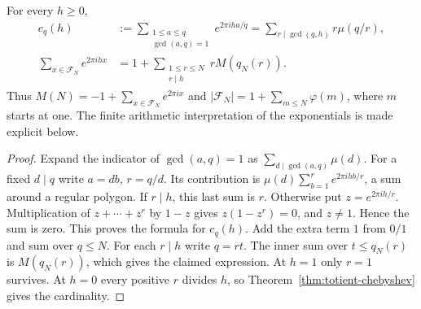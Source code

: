 \begin{theorem}\label{thm:farey}
For every $h\ge0$,
\begin{align*}
 c_q(h)&:=\sum_{\substack{1\le a\le q\\\gcd(a,q)=1}}
       e^{2\pi i ha/q}=\sum_{r\mid\gcd(q,h)}r\mu(q/r),\\
 \sum_{x\in\mathcal F_N} e^{2\pi i h x}
    &= 1+\sum_{\substack{1\le r\le N\\r\mid h}}rM(q_N(r)).
\end{align*}
Thus $M(N)=-1+\sum_{x\in\mathcal F_N}e^{2\pi i x}$ and
$|\mathcal F_N|=1+\sum_{m\le N}\varphi(m)$, where $m$ starts at one.
The finite arithmetic interpretation of the exponentials is made explicit below.
\end{theorem}
\begin{proof}
Expand the indicator of $\gcd(a,q)=1$ as $\sum_{d\mid\gcd(a,q)}\mu(d)$.
For a fixed $d\mid q$ write $a=db$, $r=q/d$. Its contribution is
$\mu(d)\sum_{b=1}^r e^{2\pi i hb/r}$, a sum around a regular polygon.
If $r\mid h$, this last sum is $r$. Otherwise put $z=e^{2\pi i h/r}$.
Multiplication of $z+\cdots+z^r$ by $1-z$ gives $z(1-z^r)=0$, and
$z\ne1$. Hence the sum is zero. This proves the formula for $c_q(h)$.
Add the extra term $1$ from $0/1$ and sum over $q\le N$. For each
$r\mid h$ write $q=rt$. The inner sum over $t\le q_N(r)$ is $M(q_N(r))$,
which gives the claimed expression. At $h=1$ only $r=1$ survives. At
$h=0$ every positive $r$ divides $h$, so Theorem~\ref{thm:totient-chebyshev}
gives the cardinality.


\end{proof}
